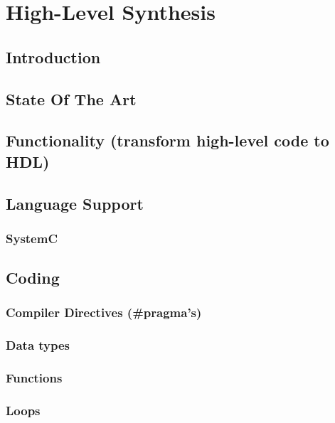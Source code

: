\chapter[HLS]{High-Level Synthesis}
\label{cha:HLS}

\section{Introduction}

\section{State Of The Art}

\section{Functionality (transform high-level code to HDL)}

\section{Language Support}

  \subsection{\cplusplus}

  \subsection{SystemC}

\section{Coding}

  \subsection{Compiler Directives (\#pragma's)}

  \subsection{Data types}

  \subsection{Functions}

  \subsection{Loops}

